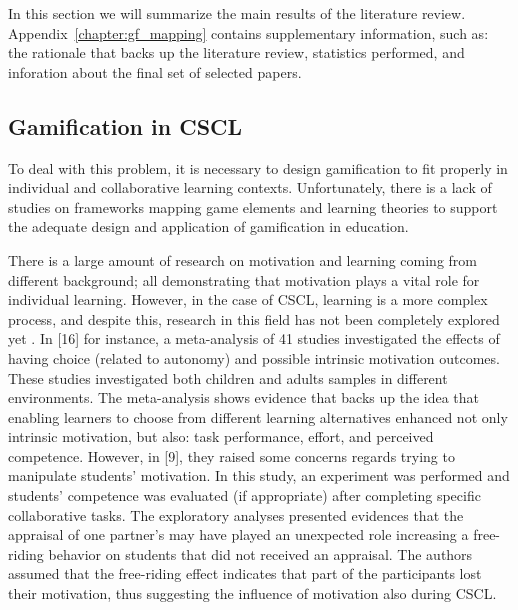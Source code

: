 In this section we will summarize the main results of the literature review. Appendix~\ref{chapter:gf_mapping} contains supplementary information, such as: the rationale that backs up the literature review, statistics performed, and inforation about the final set of selected papers.






\subsection{Gamification in CSCL}

To deal with this problem, it is necessary to design gamification to fit properly in individual and collaborative learning contexts. Unfortunately, there is a lack of studies on frameworks mapping game elements and learning theories to support the adequate design and application of gamification in education. 


There is a large amount of research on motivation and learning coming from different background; all demonstrating that motivation plays a vital role for individual learning. However, in the case of CSCL, learning is a more complex process, and despite this, research in this field has not been completely explored yet \cite{Motivation_in_a_computer-supported_collaborative_learning}. In [16] for instance, a meta-analysis of 41 studies investigated the effects of having choice (related to autonomy) and possible intrinsic motivation outcomes. These studies investigated both children and adults samples in different environments. The meta-analysis shows evidence that backs up the idea that enabling learners to choose from different learning alternatives enhanced not only intrinsic motivation, but also: task performance, effort, and perceived competence. However, in [9], they raised some concerns regards trying to manipulate students’ motivation. In this study, an experiment was performed and students' competence was evaluated (if appropriate) after completing specific collaborative tasks. The exploratory analyses presented evidences that the appraisal of one partner’s may have played an unexpected role increasing a free-riding behavior on students that did not received an appraisal. The authors assumed that the free-riding effect indicates that part of the participants lost their motivation, thus suggesting the influence of motivation also during CSCL. 


